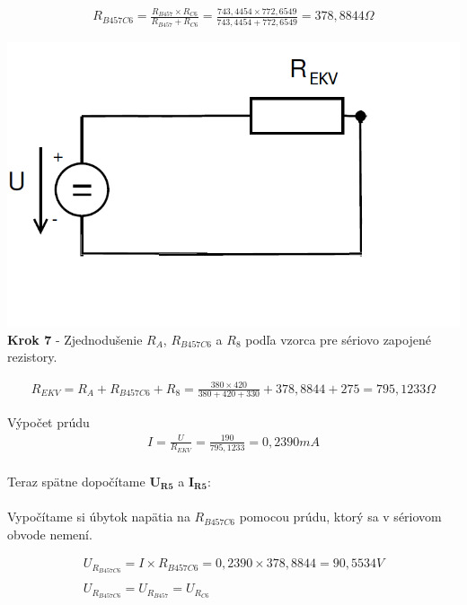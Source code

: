 \begin{gather*}
R_{B457C6}=\frac{R_{B457}  \times R_{C6}}{R_{B457}+R_{C6}}=\frac{743,4454  \times 772,6549}{743,4454+772,6549}=378,8844\Omega 
\end{gather*}


\begin{center}
\includegraphics[scale=0.5,keepaspectratio]{fig/obr/Pr1_7.png} \\
\textbf{Krok 7} - Zjednodušenie $R_{A}$, $R_{B457C6}$ a $R_{8}$ podľa vzorca pre sériovo zapojené rezistory.
\end{center}

\begin{gather*}
R_{EKV}=R_{A}+R_{B457C6}+R_{8}=\frac{380 \times 420}{380+420+330}+378,8844+275=795,1233\Omega 
\end{gather*}



Výpočet prúdu
\begin{gather*}
    I = \frac{U}{R_{EKV}} = \frac{190}{795,1233} = 0,2390mA \\
\end{gather*}

\newpage

\noindent Teraz spätne dopočítame $\boldsymbol{U_{R5}}$ a $\boldsymbol{I_{R5}}$:
\\\\
Vypočítame si úbytok napätia na $R_{B457C6}$ pomocou prúdu, ktorý sa v sériovom obvode nemení.

\begin{gather*}
    U_{R_{B457C6}} = I \times R_{B457C6} = 0,2390 \times 378,8844 = 90,5534V \\\\
   U_{R_{B457C6}} = U_{R_{B457}}=U_{R_{C6}} \\
\end{gather*}

